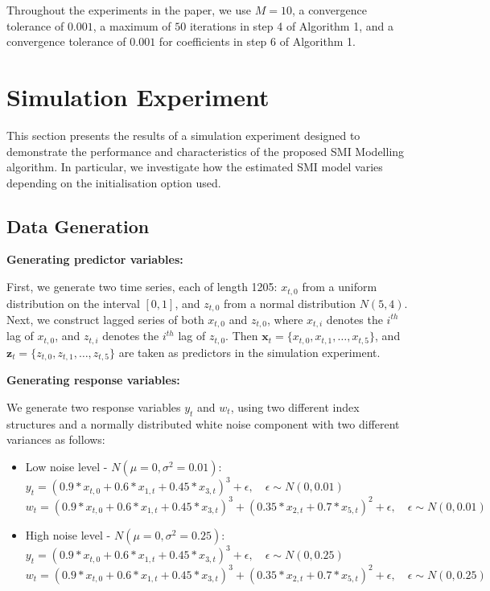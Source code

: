 \documentclass[
  11pt,
  a4paper,
]{article}
\begin{document}
Throughout the experiments in the paper, we use \(M = 10\), a
convergence tolerance of \(0.001\), a maximum of \(50\) iterations in
step 4 of Algorithm 1, and a convergence tolerance of \(0.001\) for
coefficients in step 6 of Algorithm 1.

\section{Simulation Experiment}\label{sec-simulation}

This section presents the results of a simulation experiment designed to
demonstrate the performance and characteristics of the proposed SMI
Modelling algorithm. In particular, we investigate how the estimated SMI
model varies depending on the initialisation option used.

\subsection{Data Generation}\label{sec-datagen}

\textbf{Generating predictor variables:}

First, we generate two time series, each of length 1205: \(x_{t,0}\)
from a uniform distribution on the interval \([0, 1]\), and \(z_{t,0}\)
from a normal distribution \(N(5, 4)\). Next, we construct lagged series
of both \(x_{t,0}\) and \(z_{t,0}\), where \(x_{t,i}\) denotes the
\(i^{th}\) lag of \(x_{t,0}\), and \(z_{t,i}\) denotes the \(i^{th}\)
lag of \(z_{t,0}\). Then
\(\bm{x}_t = \{x_{t,0}, x_{t,1}, \dots, x_{t,5}\}\), and
\(\bm{z}_t = \{z_{t,0}, z_{t,1}, \dots, z_{t,5}\}\) are taken as
predictors in the simulation experiment.

\textbf{Generating response variables:}

We generate two response variables \(y_{t}\) and \(w_{t}\), using two
different index structures and a normally distributed white noise
component with two different variances as follows:

\begin{itemize}
\item
  Low noise level - \(N(\mu = 0, \sigma^2 = 0.01)\):\\
  \(y_{t} = (0.9*x_{t,0} + 0.6*x_{1,t} + 0.45*x_{3,t})^3 + \epsilon, \quad \epsilon\sim N(0, 0.01)\)\\
  \(w_{t} = (0.9*x_{t,0} + 0.6*x_{1,t} + 0.45*x_{3,t})^3 + (0.35*x_{2,t} + 0.7*x_{5,t})^2 + \epsilon, \quad \epsilon\sim N(0, 0.01)\)
\item
  High noise level - \(N(\mu = 0, \sigma^2 = 0.25)\):\\
  \(y_{t} = (0.9*x_{t,0} + 0.6*x_{1,t} + 0.45*x_{3,t})^3 + \epsilon, \quad \epsilon\sim N(0, 0.25)\)\\
  \(w_{t} = (0.9*x_{t,0} + 0.6*x_{1,t} + 0.45*x_{3,t})^3 + (0.35*x_{2,t} + 0.7*x_{5,t})^2 + \epsilon, \quad \epsilon\sim N(0, 0.25)\)
\end{itemize}
\end{document}
